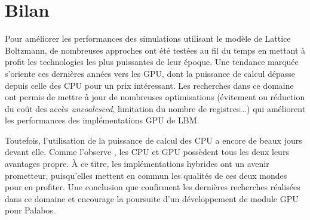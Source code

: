 \section{Bilan}
Pour améliorer les performances des simulations utilisant le modèle de Lattice Boltzmann, de nombreuses approches ont été testées au fil du temps en mettant à profit les technologies les plus puissantes de leur époque. Une tendance marquée s'oriente ces dernières années vers les \acs{GPU}, dont la puissance de calcul dépasse depuis celle des \acs{CPU} pour un prix intéressant. Les recherches dans ce domaine ont permis de mettre à jour de nombreuses optimisations (évitement ou réduction du coût des accès \textit{uncoalesced}, limitation du nombre de registres...) qui améliorent les performances des implémentations \acs{GPU} de \acs{LBM}.

Toutefois, l'utilisation de la puissance de calcul des \acs{CPU} a encore de beaux jours devant elle. Comme l'observe \citet{kaufman_implementing_2009}, les \acs{CPU} et \acs{GPU} possèdent tous les deux leurs avantages propre. À ce titre, les implémentations hybrides ont un avenir prometteur, puisqu'elles mettent en commun les qualités de ces deux mondes pour en profiter. Une conclusion que confirment les dernières recherches réalisées dans ce domaine et encourage la poursuite d'un développement de module \acs{GPU} pour Palabos.
